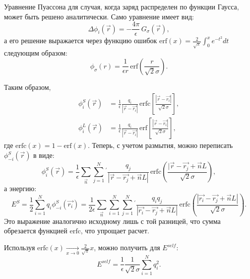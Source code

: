 Уравнение Пуассона для случая, когда заряд распределен по функции Гаусса, может быть решено аналитически. Само уравнение имеет вид:
\begin{equation}
    \label{eq:jel:phi_poisson}
    \Delta \phi_i (\vec{r}) = - \frac{4\pi}{\epsilon}\, G_\sigma (\vec{r}),
\end{equation}
а его решение выражается через функцию ошибок $\mathrm{erf} (x) = \frac{2}{\sqrt{\pi}} \int_0^x e^{-t^2} dt$ следующим образом:
\begin{equation}
    \label{eq:jel:phi_solution}
    \phi_\sigma (r) = \frac{1}{\epsilon r}\, \mathrm{erf} \left( \frac{r}{\sqrt{2}\sigma} \right).
\end{equation}

Таким образом,
\begin{equation}
\label{eq:jel:phi_S_solution}
\begin{aligned}
    \phi_i^S (\vec{r}) &= \frac{1}{\epsilon} \frac{q_i}{|\vec{r} -\vec{r_i}|}\, \mathrm{erfc} \left[ \frac{|\vec{r} - \vec{r_i}|}{\sqrt{2} \sigma} \right], \\
    \phi_i^L (\vec{r}) &= \frac{1}{\epsilon} \frac{q_i}{|\vec{r} -\vec{r_i}|}\, \mathrm{erf} \left[ \frac{|\vec{r} - \vec{r_i}|}{\sqrt{2} \sigma} \right],
\end{aligned}
\end{equation}
где $\mathrm{erfc} (x) = 1 - \mathrm{erf} (x)$. Теперь, с учетом размытия, можно переписать $\phi^S_{-i} (\vec{r})$ в виде:
\begin{equation*}
    \phi_i^S (\vec{r}) = \frac{1}{\epsilon} \sum_\vec{n} \sum_{j=1}^N {}^\prime \frac{q_j}{| \vec{r} - \vec{r_j} + \vec{n}L |}\, \mathrm{erfc} \left( \frac{|\vec{r} - \vec{r_j} + \vec{n}L}{\sqrt{2} \sigma} \right),
\end{equation*}
а энергию:
\begin{equation*}
    E^S = \frac{1}{2} \sum_{i=1}^N q_i \phi_{-i}^S (\vec{r_i})
    = \frac{1}{2\epsilon} \sum_\vec{n} \sum_{i=1}^N \sum_{j=1}^N {}^\prime \frac{q_i q_j}{|\vec{r_i} - \vec{r_j} + \vec{n}L|}\, \mathrm{erfc} \left( \frac{|\vec{r_i} - \vec{r_j} + \vec{n}L|}{\sqrt{2}\sigma} \right).
\end{equation*}
Это выражение аналогично исходному лишь с той разницей, что сумма обрезается функцией $\mathrm{erfc}$, что упрощает расчет.

Используя $\mathrm{erfc} (x) \xrightarrow[x \rightarrow 0]{} \frac{2}{\sqrt{\pi}} x$, можно получить для $E^{self}$:
\begin{equation}
    \label{eq:jel:E_self_final}
    E^{self} = \frac{1}{\epsilon} \frac{1}{\sqrt{2} \sigma} \sum_{i=1}^N q_i^2.
\end{equation}

